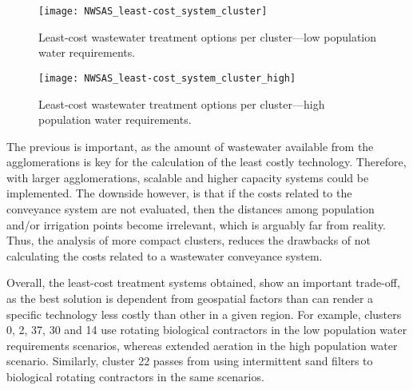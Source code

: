 \begin{figure*}[!ht]
	\centering
	\texttt{[image: NWSAS\_least-cost\_system\_cluster]}
	\caption{Least-cost wastewater treatment options per cluster---low population water requirements.}
	\label{fig:leastLow}
\end{figure*}

\begin{figure*}[!ht]
	\centering
	\texttt{[image: NWSAS\_least-cost\_system\_cluster\_high]}
	\caption{Least-cost wastewater treatment options per cluster---high population water requirements.}
	\label{fig:leastHigh}
\end{figure*}

The previous is important, as the amount of wastewater available from the agglomerations is key for the calculation of the least costly technology. Therefore, with larger agglomerations, scalable and higher capacity systems could be implemented. The downside however, is that if the costs related to the conveyance system are not evaluated, then the distances among population and/or irrigation points become irrelevant, which is arguably far from reality. Thus, the analysis of more compact clusters, reduces the drawbacks of not calculating the costs related to a wastewater conveyance system.

Overall, the least-cost treatment systems obtained, show an important trade-off, as the best solution is dependent from geospatial factors than can render a specific technology less costly than other in a given region. For example, clusters 0, 2, 37, 30 and 14 use rotating biological contractors in the low population water requirements scenarios, whereas extended aeration in the high population water scenario. Similarly, cluster 22 passes from using intermittent sand filters to biological rotating contractors in the same scenarios.


